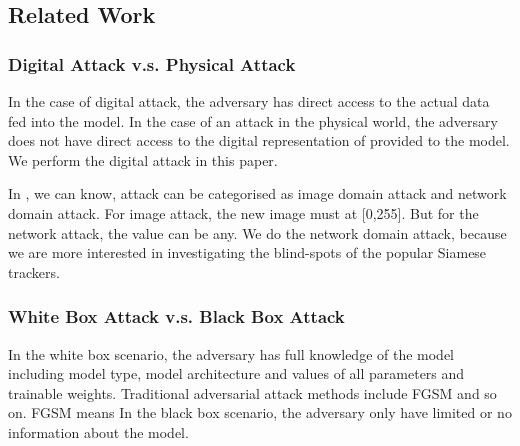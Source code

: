 \documentclass{article}
\begin{document}
\subsection{Related Work}

\subsubsection{Digital Attack v.s. Physical Attack}

In the case of digital attack, the adversary has direct access to the actual data fed into the model. In the case of an attack in the physical world, the adversary does not have direct access to the digital representation of provided to the model. We perform the digital attack in this paper.

In \cite{karmon2018lavan}, we can know, attack can be categorised as image domain attack and network domain attack. For image attack, the new image must at [0,255]. But for the network attack, the value can be any. We do the network domain attack, because we are more interested in investigating the blind-spots of the popular Siamese trackers.

\subsubsection{White Box Attack v.s. Black Box Attack}

In the white box scenario, the adversary has full knowledge of the model including model type, model architecture and values of all parameters and trainable weights.
Traditional adversarial attack methods include FGSM \cite{FGSM} and so on. FGSM means In the black box scenario, the adversary only have limited or no information about the model.

\fi
\end{document}
